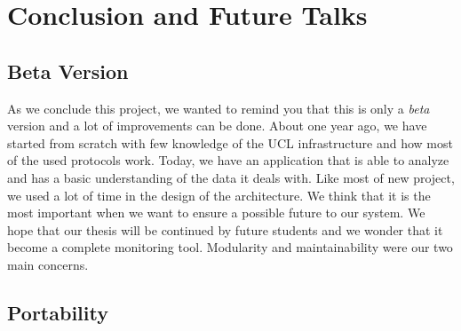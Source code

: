 
\chapter{Conclusion and Future Talks} %

\label{Chapter 7} %


\section{Beta Version}
As we conclude this project, we wanted to remind you that this is only a \emph{beta} version and a lot of improvements can be done. About one year ago, we have started from scratch with few knowledge of the UCL infrastructure and how most of the used protocols work. Today, we have an application that is able to analyze and has a basic understanding of the data it deals with. Like most of new project, we used a lot of time in the design of the architecture. We think that it is the most important when we want to ensure a possible future to our system. We hope that our thesis will be continued by future students and we wonder that it become a complete monitoring tool. Modularity and maintainability were our two main concerns.

\section{Portability}



